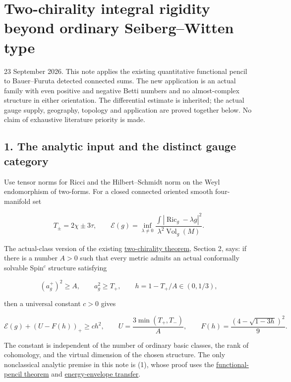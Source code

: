 \documentclass[
  11pt,
]{article}
\author{}
\date{23 September 2026}
\begin{document}
\hypertarget{two-chirality-integral-rigidity-beyond-ordinary-seibergwitten-type}{%
\section{Two-chirality integral rigidity beyond ordinary Seiberg--Witten
type}\label{two-chirality-integral-rigidity-beyond-ordinary-seibergwitten-type}}

23 September 2026. This note applies the existing quantitative
functional pencil to Bauer--Furuta detected connected sums. The new
application is an actual family with even positive and negative Betti
numbers and no almost-complex structure in either orientation. The
differential estimate is inherited; the actual gauge supply, geography,
topology and application are proved together below. No claim of
exhaustive literature priority is made.

\hypertarget{the-analytic-input-and-the-distinct-gauge-category}{%
\subsection{1. The analytic input and the distinct gauge
category}\label{the-analytic-input-and-the-distinct-gauge-category}}

Use tensor norms for Ricci and the Hilbert--Schmidt norm on the Weyl
endomorphism of two-forms. For a closed connected oriented smooth
four-manifold set

\[
 T_\pm=2\chi\pm3\tau,\qquad
 \mathcal E(g)=\inf_{\lambda\ne0}
 \frac{\int|\operatorname{Ric}_g-\lambda g|^2}
      {\lambda^2\operatorname{Vol}_g(M)}.
\]

The actual-class version of the existing
\href{line1_two_chirality_topology.md}{two-chirality theorem}, Section
2, says: if there is a number \(A>0\) such that every metric admits an
actual conformally solvable Spin\(^c\) structure satisfying

\[
 (a_g^+)^2\ge A,\qquad a_g^2\ge T_+,
 \qquad h=1-T_+/A\in(0,1/3),
\]

then a universal constant \(c>0\) gives

\[
 \mathcal E(g)+(U-F(h))_+\ge ch^2,\qquad
 U=\frac{3\min(T_+,T_-)}A,
 \qquad F(h)=\frac{(4-\sqrt{1-3h})^2}{9}.
 \tag{1}
\]

The constant is independent of the number of ordinary basic classes, the
rank of cohomology, and the virtual dimension of the chosen structure.
The only nonclassical analytic premise in this note is (1), whose proof
uses the \href{line1_functional_pencil.md}{functional-pencil theorem}
and \href{line1_energy_envelope_gap.md}{energy-envelope transfer}.
\end{document}
